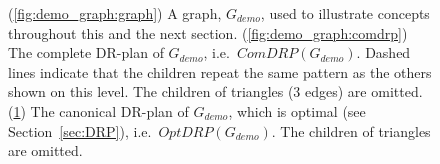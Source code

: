 \begin{figure}
\begin{subfigure}{0.3\linewidth}
    \caption{}\label{fig:demo_graph:candrp}
  \end{subfigure}%
  \caption{(\ref{fig:demo_graph:graph}) A graph, $G_{demo}$, used to illustrate concepts throughout this and the next section. (\ref{fig:demo_graph:comdrp}) The complete DR-plan of $G_{demo}$, i.e.\ $ComDRP(G_{demo})$. Dashed lines indicate that the children repeat the same pattern as the others shown on this level. The children of triangles (3 edges) are omitted. (\ref{fig:demo_graph:candrp}) The canonical DR-plan of $G_{demo}$, which is optimal (see Section~\ref{sec:DRP}), i.e.\ $OptDRP(G_{demo})$. The children of triangles are omitted.}
  \label{fig:demo_graph}
\end{figure}%



\ClearMyMinHeight
{}

%
%
%
%






